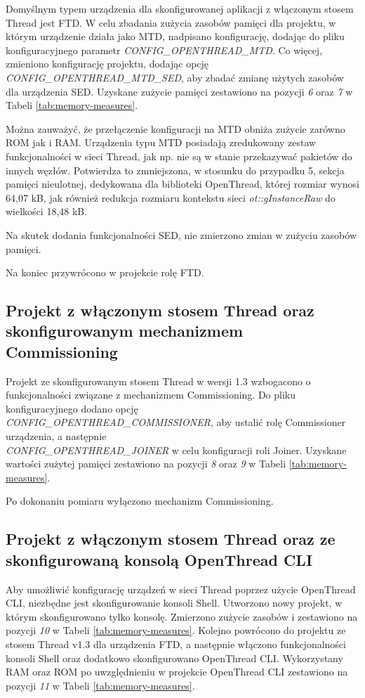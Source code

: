     Domyślnym typem urządzenia dla skonfigurowanej aplikacji z włączonym stosem Thread jest FTD. W celu zbadania zużycia zasobów pamięci dla projektu, w którym urządzenie działa jako MTD, nadpisano konfigurację, dodając do pliku konfiguracyjnego parametr \textit{CONFIG\_OPENTHREAD\_MTD}. Co więcej, zmieniono konfigurację projektu, dodając opcję \textit{CONFIG\_OPENTHREAD\_MTD\_SED}, aby zbadać zmianę użytych zasobów dla urządzenia SED. Uzyskane zużycie pamięci zestawiono na pozycji \textit{6} oraz \textit{7} w Tabeli \ref{tab:memory-measures}.

    Można zauważyć, że przełączenie konfiguracji na MTD obniża zużycie zarówno ROM jak i RAM. Urządzenia typu MTD posiadają zredukowany zestaw funkcjonalności w sieci Thread, jak np. nie są w stanie przekazywać pakietów do innych węzłów. Potwierdza to zmniejszona, w stosunku do przypadku 5, sekcja pamięci nieulotnej, dedykowana dla biblioteki OpenThread, której rozmiar wynosi 64,07 kB, jak również redukcja rozmiaru kontekstu sieci \textit{ot::gInstanceRaw} do wielkości 18,48 kB.

    Na skutek dodania funkcjonalności SED, nie zmierzono zmian w zużyciu zasobów pamięci.

    Na koniec przywrócono w projekcie rolę FTD.

    \subsection{Projekt z włączonym stosem Thread oraz skonfigurowanym mechanizmem Commissioning}
    Projekt ze skonfigurowanym stosem Thread w wersji 1.3 wzbogacono o funkcjonalności związane z mechanizmem Commissioning. Do pliku konfiguracyjnego dodano opcję \\\textit{CONFIG\_OPENTHREAD\_COMMISSIONER}, aby ustalić rolę Commissioner urządzenia, a następnie \\\textit{CONFIG\_OPENTHREAD\_JOINER} w celu konfiguracji roli Joiner. Uzyskane wartości zużytej pamięci zestawiono na pozycji \textit{8} oraz \textit{9} w Tabeli \ref{tab:memory-measures}.
    
    Po dokonaniu pomiaru wyłączono mechanizm Commissioning.

    \subsection{Projekt z włączonym stosem Thread oraz ze skonfigurowaną konsolą OpenThread CLI}

    Aby umożliwić konfigurację urządzeń w sieci Thread poprzez użycie OpenThread CLI, niezbędne jest skonfigurowanie konsoli Shell. Utworzono nowy projekt, w którym skonfigurowano tylko konsolę. Zmierzono zużycie zasobów i zestawiono na pozycji \textit{10} w Tabeli \ref{tab:memory-measures}. Kolejno powrócono do projektu ze stosem Thread v1.3 dla urządzenia FTD, a następnie włączono funkcjonalności konsoli Shell oraz dodatkowo skonfigurowano OpenThread CLI. Wykorzystany RAM oraz ROM po uwzględnieniu w projekcie OpenThread CLI zestawiono na pozycji \textit{11} w Tabeli \ref{tab:memory-measures}.
        
